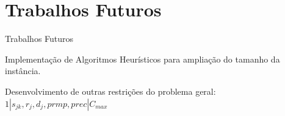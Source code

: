 \documentclass{beamer}
\begin{document}
\section{Trabalhos Futuros}
\begin{frame}
\tableofcontents[ 
    currentsubsection, 
    hideothersubsections, 
    sectionstyle=show/shaded
    ] 
\end{frame}
\begin{frame}{Trabalhos Futuros}
\begin{block}{}
\Large
Implementação de Algoritmos Heurísticos para ampliação do tamanho da instância.
\end{block}
\pause
\begin{block}{}
\Large
Desenvolvimento de outras restrições do problema geral:
$1|s_{jk}, r_{j},d_{j},prmp,prec|C_{max}$
\end{block}
\end{frame}

\end{document}
